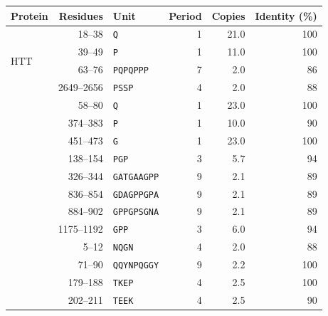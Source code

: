 \begin{tabular}{@{}lrlrrr@{}}
\toprule
Protein & Residues & Unit & Period & Copies & Identity (\%) \\
\midrule
\multirow{4}{*}{HTT} & 18--38 & \texttt{Q} & 1 & 21.0 & 100 \\
 & 39--49 & \texttt{P} & 1 & 11.0 & 100 \\
 & 63--76 & \texttt{PQPQPPP} & 7 & 2.0 & 86 \\
 & 2649--2656 & \texttt{PSSP} & 4 & 2.0 & 88 \\
\addlinespace
\multirow{3}{*}{AR} & 58--80 & \texttt{Q} & 1 & 23.0 & 100 \\
 & 374--383 & \texttt{P} & 1 & 10.0 & 90 \\
 & 451--473 & \texttt{G} & 1 & 23.0 & 100 \\
\addlinespace
\multirow{5}{*}{COL1A1} & 138--154 & \texttt{PGP} & 3 & 5.7 & 94 \\
 & 326--344 & \texttt{GATGAAGPP} & 9 & 2.1 & 89 \\
 & 836--854 & \texttt{GDAGPPGPA} & 9 & 2.1 & 89 \\
 & 884--902 & \texttt{GPPGPSGNA} & 9 & 2.1 & 89 \\
 & 1175--1192 & \texttt{GPP} & 3 & 6.0 & 94 \\
\addlinespace
\multirow{4}{*}{SUP35} & 5--12 & \texttt{NQGN} & 4 & 2.0 & 88 \\
 & 71--90 & \texttt{QQYNPQGGY} & 9 & 2.2 & 100 \\
 & 179--188 & \texttt{TKEP} & 4 & 2.5 & 100 \\
 & 202--211 & \texttt{TEEK} & 4 & 2.5 & 90 \\
\bottomrule
\end{tabular}
